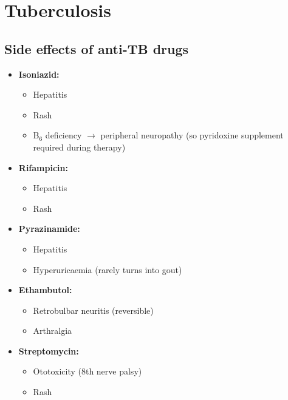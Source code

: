 \documentclass[
  12pt,
]{memoir}
\providecommand{\tightlist}{%
  \setlength{\itemsep}{0pt}\setlength{\parskip}{0pt}}
\begin{document}
\hypertarget{tuberculosis}{%
\section{Tuberculosis}\label{tuberculosis}}

\hypertarget{side-effects-of-anti-tb-drugs}{%
\subsection{Side effects of anti-TB
drugs}\label{side-effects-of-anti-tb-drugs}}

\begin{itemize}
\tightlist
\item
  \textbf{Isoniazid:}

  \begin{itemize}
  \tightlist
  \item
    Hepatitis
  \item
    Rash
  \item
    B\(_6\) deficiency \(\rightarrow\) peripheral neuropathy (so
    pyridoxine supplement required during therapy)
  \end{itemize}
\item
  \textbf{Rifampicin:}

  \begin{itemize}
  \tightlist
  \item
    Hepatitis
  \item
    Rash
  \end{itemize}
\item
  \textbf{Pyrazinamide:}

  \begin{itemize}
  \tightlist
  \item
    Hepatitis
  \item
    Hyperuricaemia (rarely turns into gout)
  \end{itemize}
\item
  \textbf{Ethambutol:}

  \begin{itemize}
  \tightlist
  \item
    Retrobulbar neuritis (reversible)
  \item
    Arthralgia
  \end{itemize}
\item
  \textbf{Streptomycin:}

  \begin{itemize}
  \tightlist
  \item
    Ototoxicity (8th nerve palsy)
  \item
    Rash
  \end{itemize}
\end{itemize}
\end{document}
